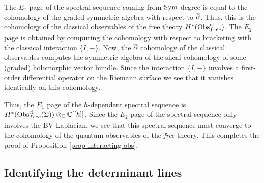 The $E_1$-page of the spectral sequence coming from ${\rm Sym}$-degree is equal to the cohomology of the graded symmetric algebra with respect to $\overline{\partial}$. 
Thus, this is the cohomology of the classical observables of the free theory $H^*({\rm Obs}^{{\rm cl}}_{free})$. 
The $E_2$ page is obtained by computing the cohomology with respect to bracketing with the classical interaction $\{I,-\}$. 
Now, the $\overline{\partial}$ cohomology of the classical observables computes the symmetric algebra of the sheaf cohomology of some (graded) holomorphic vector bundle.
Since the interaction $\{I,-\}$ involves a first-order differential operator on the Riemann surface we see that it vanishes identically on this cohomology. 

Thus, the $E_1$ page of the $\hbar$-dependent spectral sequence is $H^*({\rm Obs}^{{\rm cl}}_{free}(\Sigma)) \otimes_\mathbb C \mathbb C[[\hbar]]$. 
Since the $E_2$ page of the spectral sequence only involves the BV Laplacian, we see that this spectral sequence must converge to the cohomology of the quantum observables of the {\em free} theory. 
This completes the proof of Proposition \ref{prop interacting obs}.


\subsection{Identifying the determinant lines}

